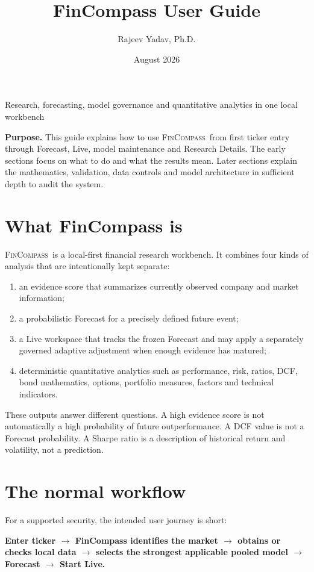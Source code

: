 \documentclass[11pt]{article}
\title{\textbf{FinCompass User Guide}}
\author{Rajeev Yadav, Ph.D.}
\date{August 2026}
\newcommand{\FC}{\textsc{FinCompass}}
\begin{document}
\maketitle
\begin{center}
\large Research, forecasting, model governance and quantitative analytics in one local workbench
\end{center}
\vspace{1em}
\noindent\textbf{Purpose.} This guide explains how to use \FC\ from first ticker entry through Forecast, Live, model maintenance and Research Details. The early sections focus on what to do and what the results mean. Later sections explain the mathematics, validation, data controls and model architecture in sufficient depth to audit the system.

\tableofcontents
\newpage

\section{What FinCompass is}
\FC\ is a local-first financial research workbench. It combines four kinds of analysis that are intentionally kept separate:
\begin{enumerate}[itemsep=0.2em]
\item an evidence score that summarizes currently observed company and market information;
\item a probabilistic Forecast for a precisely defined future event;
\item a Live workspace that tracks the frozen Forecast and may apply a separately governed adaptive adjustment when enough evidence has matured;
\item deterministic quantitative analytics such as performance, risk, ratios, DCF, bond mathematics, options, portfolio measures, factors and technical indicators.
\end{enumerate}

These outputs answer different questions. A high evidence score is not automatically a high probability of future outperformance. A DCF value is not a Forecast probability. A Sharpe ratio is a description of historical return and volatility, not a prediction.

\section{The normal workflow}
For a supported security, the intended user journey is short:
\begin{center}
\textbf{Enter ticker $\rightarrow$ FinCompass identifies the market $\rightarrow$ obtains or checks local data $\rightarrow$ selects the strongest applicable pooled model $\rightarrow$ Forecast $\rightarrow$ Start Live.}
\end{center}
\end{document}
